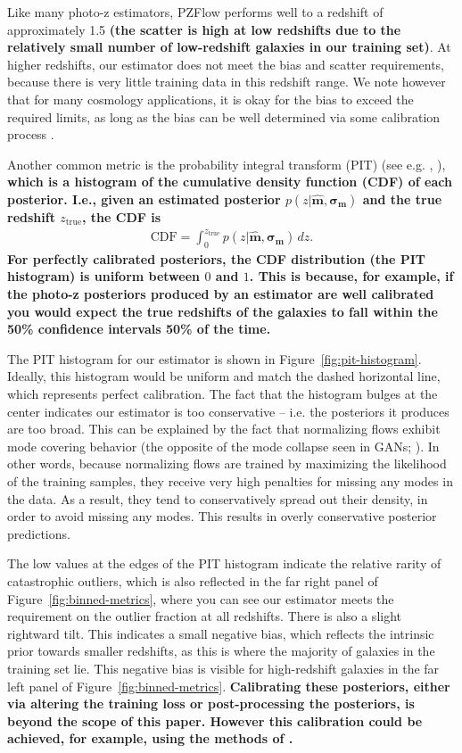 \documentclass[twocolumn,twocolappendix]{aastex631}
\newcommand{\citePZa}{\citetalias{schmidt2020} \citeyear{schmidt2020}\xspace}
\begin{document}
Like many photo-z estimators, PZFlow performs well to a redshift of approximately 1.5 \textbf{(the scatter is high at low redshifts due to the relatively small number of low-redshift galaxies in our training set)}.
At higher redshifts, our estimator does not meet the bias and scatter requirements, because there is very little training data in this redshift range.
We note however that for many cosmology applications, it is okay for the bias to exceed the required limits, as long as the bias can be well determined via some calibration process \citep{newman2015}.

Another common metric is the probability integral transform (PIT) (see e.g. \citePZa, \citealt{dey2022}), \textbf{which is a histogram of the cumulative density function (CDF) of each posterior.
I.e., given an estimated posterior  $p(z| \mathbf{\hat{m}}, \mathbf{\sigma_m})$ and the true redshift $z_\text{true}$, the CDF is
\begin{align}
    \mathrm{CDF} = \int_0^{z_\text{true}} p(z| \mathbf{\hat{m}}, \mathbf{\sigma_m}) \, dz.
\end{align}
For perfectly calibrated posteriors, the CDF distribution (the PIT histogram) is uniform between $0$ and $1$.
This is because, for example, if the photo-z posteriors produced by an estimator are well calibrated you would expect the true redshifts of the galaxies to fall within the 50\% confidence intervals 50\% of the time.}

The PIT histogram for our estimator is shown in Figure~\ref{fig:pit-histogram}.
Ideally, this histogram would be uniform and match the dashed horizontal line, which represents perfect calibration.
The fact that the histogram bulges at the center indicates our estimator is too conservative -- i.e. the posteriors it produces are too broad.
This can be explained by the fact that normalizing flows exhibit mode covering behavior (the opposite of the mode collapse seen in GANs; \citealt{salimans2016}).
In other words, because normalizing flows are trained by maximizing the likelihood of the training samples, they receive very high penalties for missing any modes in the data.
As a result, they tend to conservatively spread out their density, in order to avoid missing any modes.
This results in overly conservative posterior predictions.

The low values at the edges of the PIT histogram indicate the relative rarity of catastrophic outliers, which is also reflected in the far right panel of Figure~\ref{fig:binned-metrics}, where you can see our estimator meets the requirement on the outlier fraction at all redshifts.
There is also a slight rightward tilt.
This indicates a small negative bias, which reflects the intrinsic prior towards smaller redshifts, as this is where the majority of galaxies in the training set lie.
This negative bias is visible for high-redshift galaxies in the far left panel of Figure~\ref{fig:binned-metrics}.
\textbf{Calibrating these posteriors, either via altering the training loss or post-processing the posteriors, is beyond the scope of this paper.
However this calibration could be achieved, for example, using the methods of \citet{dey2022}.}
\end{document}

